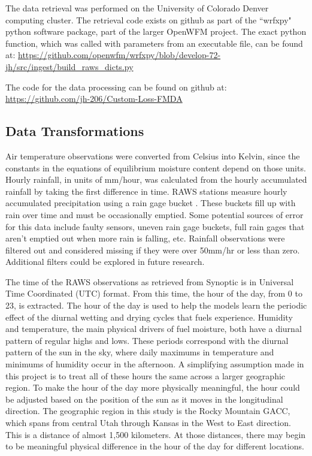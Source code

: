 
The data retrieval was performed on the University of Colorado Denver computing cluster. The retrieval code exists on github as part of the ``wrfxpy" python software package, part of the larger OpenWFM project. The exact python function, which was called with parameters from an executable file, can be found at: \url{https://github.com/openwfm/wrfxpy/blob/develop-72-jh/src/ingest/build_raws_dicts.py}

The code for the data processing can be found on github at: \url{https://github.com/jh-206/Custom-Loss-FMDA}

\subsection{Data Transformations}

Air temperature observations were converted from Celsius into Kelvin, since the constants in the equations of equilibrium moisture content depend on those units. Hourly rainfall, in units of mm/hour, was calculated from the hourly accumulated rainfall by taking the first difference in time. RAWS stations measure hourly accumulated precipitation using a rain gage bucket \citep{Campbell-2017-RMM}. These buckets fill up with rain over time and must be occasionally emptied. Some potential sources of error for this data include faulty sensors, uneven rain gage buckets, full rain gages that aren't emptied out when more rain is falling, etc. Rainfall observations were filtered out and considered missing if they were over 50mm/hr or less than zero. Additional filters could be explored in future research.

The time of the RAWS observations as retrieved from Synoptic is in Universal Time Coordinated (UTC) format. From this time, the hour of the day, from 0 to 23, is extracted. The hour of the day is used to help the models learn the periodic effect of the diurnal wetting and drying cycles that fuels experience. Humidity and temperature, the main physical drivers of fuel moisture, both have a diurnal pattern of regular highs and lows. These periods correspond with the diurnal pattern of the sun in the sky, where daily maximums in temperature and minimums of humidity occur in the afternoon. A simplifying assumption made in this project is to treat all of these hours the same across a larger geographic region. To make the hour of the day more physically meaningful, the hour could be adjusted based on the position of the sun as it moves in the longitudinal direction. The geographic region in this study is the Rocky Mountain GACC, which spans from central Utah through Kansas in the West to East direction. This is a distance of almost 1,500 kilometers. At those distances, there may begin to be meaningful physical difference in the hour of the day for different locations. 

